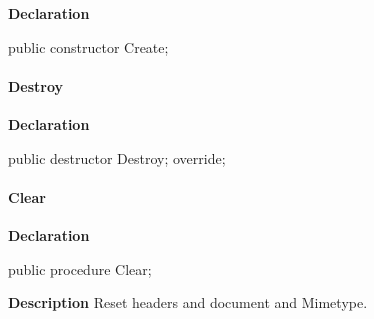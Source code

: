 \documentclass{report}
\newif\ifpdf
\begin{document}
\label{httpsend.THTTPSend-Create}
\begin{list}{}{
\setlength{\itemindent}{0cm}
\setlength{\listparindent}{0cm}
\setlength{\leftmargin}{\evensidemargin}
\addtolength{\leftmargin}{\tmplength}
\settowidth{\labelsep}{X}
\addtolength{\leftmargin}{\labelsep}
\setlength{\labelwidth}{\tmplength}
}
\item[\textbf{Declaration}\hfill]
\ifpdf
\begin{flushleft}
\fi
\begin{ttfamily}
public constructor Create;\end{ttfamily}

\ifpdf
\end{flushleft}
\fi

\end{list}
\paragraph*{Destroy}\hspace*{\fill}

\label{httpsend.THTTPSend-Destroy}
\begin{list}{}{
\setlength{\itemindent}{0cm}
\setlength{\listparindent}{0cm}
\setlength{\leftmargin}{\evensidemargin}
\addtolength{\leftmargin}{\tmplength}
\settowidth{\labelsep}{X}
\addtolength{\leftmargin}{\labelsep}
\setlength{\labelwidth}{\tmplength}
}
\item[\textbf{Declaration}\hfill]
\ifpdf
\begin{flushleft}
\fi
\begin{ttfamily}
public destructor Destroy; override;\end{ttfamily}

\ifpdf
\end{flushleft}
\fi

\end{list}
\paragraph*{Clear}\hspace*{\fill}

\label{httpsend.THTTPSend-Clear}
\begin{list}{}{
\setlength{\itemindent}{0cm}
\setlength{\listparindent}{0cm}
\setlength{\leftmargin}{\evensidemargin}
\addtolength{\leftmargin}{\tmplength}
\settowidth{\labelsep}{X}
\addtolength{\leftmargin}{\labelsep}
\setlength{\labelwidth}{\tmplength}
}
\item[\textbf{Declaration}\hfill]
\ifpdf
\begin{flushleft}
\fi
\begin{ttfamily}
public procedure Clear;\end{ttfamily}

\ifpdf
\end{flushleft}
\fi

\par
\item[\textbf{Description}]
Reset headers and document and Mimetype.

\end{list}
\end{document}
